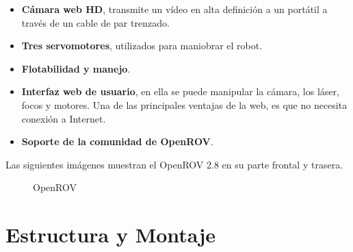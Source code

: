   \begin{itemize}
  \item \textbf{Cámara web HD}, transmite un vídeo en alta definición a un portátil a través de un cable de par trenzado.
  \item \textbf{Tres servomotores}, utilizados para maniobrar el robot.
  \item \textbf{Flotabilidad y manejo}.
  \item \textbf{Interfaz web de usuario}, en ella se puede manipular la cámara, los láser, focos y motores. Una de las principales ventajas de la web, es que no necesita conexión a Internet.
  \item \textbf{Soporte de la comunidad de OpenROV}.
  \end{itemize}
Las siguientes imágenes muestran el OpenROV 2.8 en su parte frontal y trasera.
\begin{figure}[hbtp]
  \begin{center}
  \end{center}
  \caption{OpenROV}
  \label{fig:ROV-ej}
\end{figure}
\newpage
\section{Estructura y Montaje}
\label{cap:montaje}

